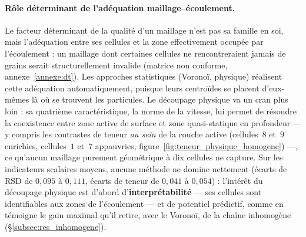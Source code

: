 \documentclass[french]{MemoireMaster}
\begin{document}
\paragraph{Rôle déterminant de l'adéquation maillage--écoulement.}
Le facteur déterminant de la qualité d'un maillage n'est pas sa famille en soi, mais l'adéquation entre ses cellules et la zone effectivement occupée par l'écoulement : un maillage dont certaines cellules ne rencontreraient jamais de grains serait structurellement invalide (matrice non conforme, annexe~\ref{annexe:dt}). Les approches statistiques (Voronoï, physique) réalisent cette adéquation automatiquement, puisque leurs centroïdes se placent d'eux-mêmes là où se trouvent les particules. Le découpage physique va un cran plus loin : sa quatrième caractéristique, la norme de la vitesse, lui permet de résoudre la coexistence entre zone active de surface et zone quasi-statique en profondeur --- y compris les contrastes de teneur \emph{au sein} de la couche active (cellules~$8$ et~$9$ enrichies, cellules~$1$ et~$7$ appauvries, figure~\ref{fig:teneur_physique_homogene}) ---, ce qu'aucun maillage purement géométrique à dix cellules ne capture. Sur les indicateurs scalaires moyens, aucune méthode ne domine nettement (écarts de RSD de $0{,}095$ à $0{,}111$, écarts de teneur de $0{,}041$ à $0{,}054$) : l'intérêt du découpage physique est d'abord d'\textbf{interprétabilité} --- ses cellules sont identifiables aux zones de l'écoulement --- et de potentiel prédictif, comme en témoigne le gain maximal qu'il retire, avec le Voronoï, de la chaîne inhomogène (\S\ref{subsec:res_inhomogene}).

\end{document}
